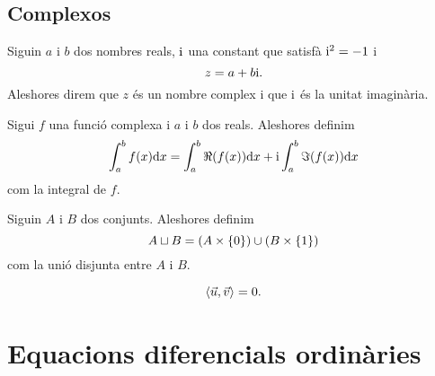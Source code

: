 \documentclass[../Apunts.tex]{subfiles}
\begin{document}
	\subsection{Complexos}
	\begin{definition}
		\label{def:nombre complex}
		\label{def:unitat imaginària}
		Siguin \(a\) i \(b\) dos nombres reals, \(\mathrm{i}\) una constant que satisfà \(\mathrm{i}^{2}=-1\) i
		\[z=a+b\mathrm{i}.\]
		Aleshores direm que \(z\) és un nombre complex i que \(\mathrm{i}\) és la unitat imaginària.
	\end{definition}
	\begin{definition}
		\label{def:integral d'una funció complexa}
		Sigui \(f\) una funció complexa i \(a\) i \(b\) dos reals. Aleshores definim
		\[\int_{a}^{b}f(x)\mathrm{d} x=\int_{a}^{b}\Re(f(x))\mathrm{d} x+\mathrm{i}\int_{a}^{b}\Im(f(x))\mathrm{d} x\]
		com la integral de \(f\).
	\end{definition}
	\begin{definition}
		\label{def:unió disjunta}
		Siguin \(A\) i \(B\) dos conjunts. Aleshores definim
		\[A\sqcup B=(A\times\{0\})\cup(B\times\{1\})\]
		com la unió disjunta entre \(A\) i \(B\).
	\end{definition}
	\begin{definition}
		\label{def:vectors perpendiculars}
		\[\prodesc{\vec{u}}{\vec{v}}=0.\]
	\end{definition}
	\section{Equacions diferencials ordinàries }
\end{document}
